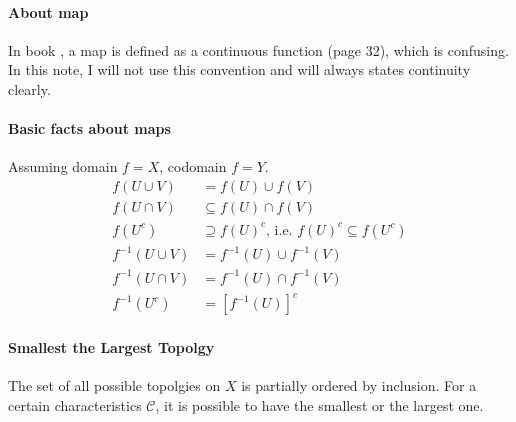 
\paragraph{About map} In book \cite{book}, a map is defined as a
continuous function (page 32), which is confusing. In this note, I
will not use this convention and will always states continuity
clearly.

\paragraph{Basic facts about maps}
Assuming domain $f=X$, codomain $f=Y$.
\begin{align}
    f(U\cup V) &= f(U)\cup f(V) \\
    f(U\cap V) &\subseteq f(U)\cap f(V) \\
    f(U^c) &\supseteq f(U)^c,\,\text{i.e. } f(U)^c \subseteq f(U^c) \\
    f^{-1}(U\cup V) &= f^{-1}(U)\cup f^{-1}(V) \\
    f^{-1}(U\cap V) &= f^{-1}(U)\cap f^{-1}(V) \\
    f^{-1}(U^c) &= [f^{-1}(U)]^c
\end{align}
\paragraph{Smallest the Largest Topolgy}
The set of all possible topolgies on $X$ is partially ordered by
inclusion. For a certain characteristics $\mathcal{C}$, it is possible
to have the smallest or the largest one. 

